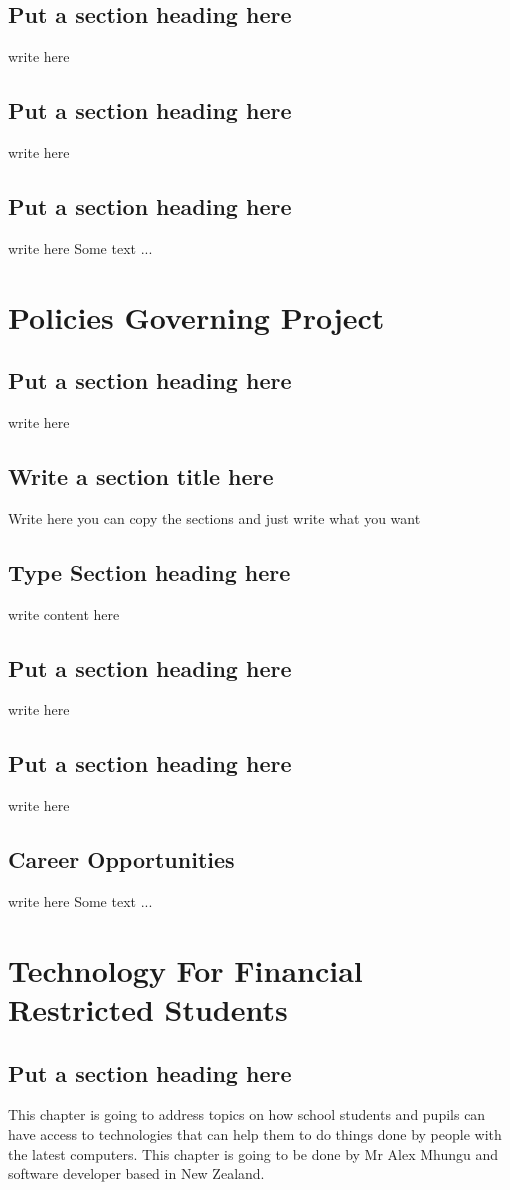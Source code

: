 \documentclass[a4paper,twoside]{scrbook}
\begin{document}
\section{Put a section heading here}
write here
\section{Put a section heading here}
write here
\section{Put a section heading here}
write here
Some text ...
\chapter{Policies Governing Project}\label{ch17}
\section{Put a section heading here}
write here
\section{Write a section title here}
Write here you can copy the sections and just write what you want
\section{Type Section heading here}
write content here
\section{Put a section heading here}
write here
\section{Put a section heading here}
write here
\section{Career Opportunities}
write here
Some text ...
\chapter{Technology For Financial Restricted Students}\label{ch18}
\section{Put a section heading here}\label{Gd}
This chapter is going to address topics on how school students and pupils can have access to technologies that can help them to do things done by people with the latest computers. This chapter is going to be done by Mr Alex Mhungu and software developer based in New Zealand.
\end{document}
